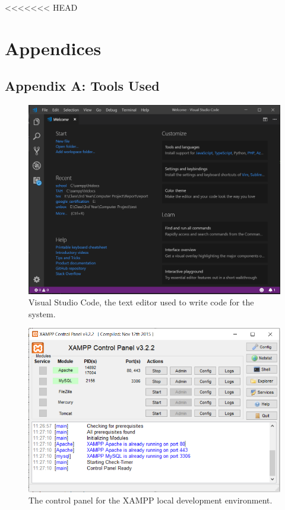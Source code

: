 <<<<<<< HEAD
\chapter{Appendices}
\section{Appendix A: Tools Used}

\begin{figure}[H]
\center
\includegraphics[scale=0.4]{images/vscode.png}
\caption{Visual Studio Code, the text editor used to write code for the system.}
\end{figure}

\begin{figure}[H]
\center
\includegraphics[scale=0.5]{images/XAMPP_cp.png}
\caption{The control panel for the XAMPP local development environment.}
\end{figure}

